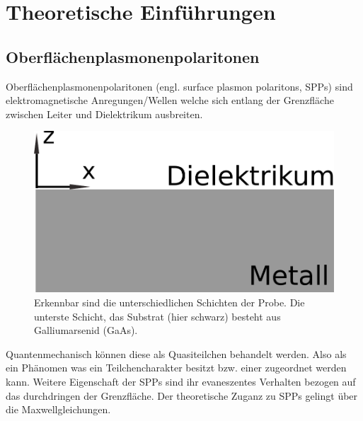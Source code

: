 \chapter{Theoretische Einführungen}

\section{Oberflächenplasmonenpolaritonen}%

Oberflächenplasmonenpolaritonen (engl. surface plasmon polaritons, SPPs)
sind elektromagnetische Anregungen/Wellen welche sich entlang der Grenzfläche 
zwischen Leiter und Dielektrikum ausbreiten.~\cite{plasmonics}
\begin{figure}
    \centering
    \includegraphics[scale=0.5]{./Plots/leiter_und_nichtleiter.pdf}
    \caption{Erkennbar sind die unterschiedlichen Schichten der Probe.
    Die unterste Schicht, das Substrat (hier schwarz) besteht aus Galliumarsenid (GaAs).}
    \label{fig:kasten}
\end{figure}
\FloatBarrier

Quantenmechanisch können diese als Quasiteilchen behandelt werden. 
Also als ein Phänomen was ein Teilchencharakter besitzt bzw. einer zugeordnet werden kann. 
Weitere Eigenschaft der SPPs sind ihr evaneszentes Verhalten bezogen auf das
durchdringen der Grenzfläche.
Der theoretische Zuganz zu SPPs gelingt über die Maxwellgleichungen.